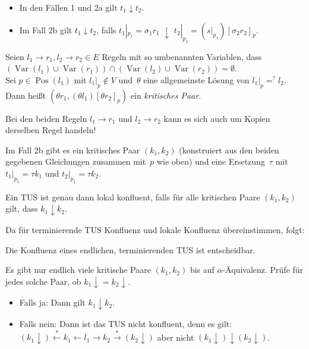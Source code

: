 \documentclass{cheat-sheet}
\newcommand{\from}{\leftarrow}
\newcommand{\reducesTo}{\xrightarrow{*}}
\newcommand{\reducesFrom}{\xleftarrow{*}}
\newcommand{\joinable}{\downarrow}
\newcommand{\NF}[1]{{{#1}\!\downarrow}} %
\DeclareMathOperator{\Pos}{Pos} %
\DeclareMathOperator{\Var}{Var} %
\begin{document}
\begin{lem}
  \begin{itemize}
    \item In den Fällen 1 und 2a gilt $t_1 \joinable t_2$.
    \item Im Fall 2b gilt $t_1 \joinable t_2$, falls $t_1|_{p_1} \!\!=\! \sigma_1 r_1 \,\,\joinable\,\, t_2|_{p_1} \!=\! (s|_{p_1}) [\sigma_2 r_2]_p$.
  \end{itemize}
\end{lem}

\begin{defn}
  Seien $l_1 \to r_1, l_2 \to r_2 \in E$ Regeln mit so umbenannten Variablen, dass $(\Var(l_1) \cup \Var(r_1)) \cap (\Var(l_2) \cup \Var(r_2)) = \emptyset$. \\
  Sei $p \in \Pos(l_1)$ mit $l_1|_p \not\in V$ und~$\theta$ eine allgemeinste Lösung von $l_1|_p =^{?} l_2$.
  Dann heißt $(\theta r_1, (\theta l_1)[\theta r_2]_p)$ ein \emph{kritisches Paar}.
\end{defn}

\begin{acht}
  Bei den beiden Regeln $l_1 \to r_1$ und $l_2 \to r_2$ kann es sich auch um Kopien derselben Regel handeln!
\end{acht}

\begin{beob}
  Im Fall 2b gibt es ein kritisches Paar $(k_1, k_2)$ (konstruiert aus den beiden gegebenen Gleichungen zusammen mit~$p$ wie oben) und eine Ersetzung~$\tau$ mit $t_1|_{p_1} = \tau k_1$ und $t_2|_{p_1} = \tau k_2$.
\end{beob}

\begin{satz}
  Ein TUS ist genau dann lokal konfluent, falls für alle kritischen Paare $(k_1, k_2)$ gilt, dass $k_1 \joinable k_2$.
\end{satz}

Da für terminierende TUS Konfluenz und lokale Konfluenz übereinstimmen, folgt:

\begin{kor}
  Die Konfluenz eines endlichen, terminierenden TUS ist entscheidbar.
\end{kor}

\begin{beweisskizze}
  Es gibt nur endlich viele kritische Paare $(k_1, k_2)$ bis auf $\alpha$-Äquivalenz.
  Prüfe für jedes solche Paar, ob $\NF{k_1} = \NF{k_2}$.
  \begin{itemize}
    \item Falls ja: Dann gilt $k_1 \joinable k_2$.
    \item Falls nein: Dann ist das TUS nicht konfluent, denn es gilt: \\
    $(\NF{k_1}) \reducesFrom k_1 \from l_1 \to k_2 \reducesTo (\NF{k_2})$ aber nicht $(\NF{k_1}) \joinable (\NF{k_2})$.
  \end{itemize}
\end{beweisskizze}


\end{document}
